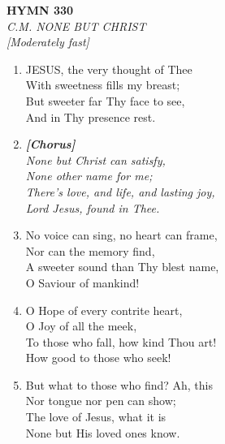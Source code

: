 \newpage
\begin{center}
    {\Large \textbf{HYMN 330}}
    \\
    \textit{C.M. NONE BUT CHRIST}
    \\
    \textit{\small [Moderately fast]}
\end{center}
\vspace{1em}

\begin{enumerate}
    \item JESUS, the very thought of Thee \\
        With sweetness fills my breast; \\
        But sweeter far Thy face to see, \\
        And in Thy presence rest.

    \item[] \vspace{0.4em}
    \textbf{\textit{[Chorus]}} \\
    \textit{None but Christ can satisfy,} \\
    \textit{None other name for me;} \\
    \textit{There's love, and life, and lasting joy,} \\
    \textit{Lord Jesus, found in Thee.}
    \vspace{0.4em}

    \item No voice can sing, no heart can frame, \\
        Nor can the memory find, \\
        A sweeter sound than Thy blest name, \\
        O Saviour of mankind!

    \item O Hope of every contrite heart, \\
        O Joy of all the meek, \\
        To those who fall, how kind Thou art! \\
        How good to those who seek!

    \item But what to those who find? Ah, this \\
        Nor tongue nor pen can show; \\
        The love of Jesus, what it is \\
        None but His loved ones know.

\end{enumerate}

